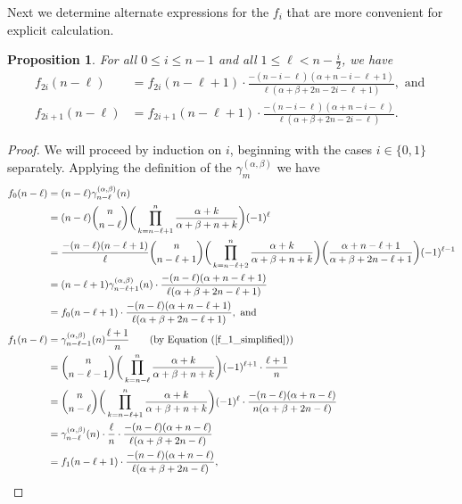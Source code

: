 \documentclass{amsart}
\theoremstyle{plain}
\newtheorem{prop}[equation]{Proposition}
\theoremstyle{remark}
\begin{document}
Next we determine alternate expressions for the $f_i$ that are more convenient for explicit calculation.

\begin{prop} \label{f(n-l)_prop}
For all $0\le i\le n-1$ and all $1\le \ell<n-\frac{i}{2}$, we have
\begin{align*}
    f_{2i}(n-\ell)&=f_{2i}(n-\ell+1)\cdot\frac{-(n-i-\ell)(\alpha+n-i-\ell+1)}{\ell(\alpha+\beta+2n-2i-\ell+1)}, \text{ and } \\
    f_{2i+1}(n-\ell)&=f_{2i+1}(n-\ell+1)\cdot\frac{-(n-i-\ell)(\alpha+n-i-\ell)}{\ell(\alpha+\beta+2n-2i-\ell)}.
\end{align*}    
\end{prop}

\begin{proof}
We will proceed by induction on $i$, beginning with the cases $i \in \lbrace 0,1\rbrace$ separately.  Applying  the definition of the $\gamma_{m}^{(\alpha,\beta)}$ we have
\begin{align*}
    f_0(n-\ell)&=(n-\ell)\gamma_{n-\ell}^{(\alpha,\beta)}(n)\\
    &=(n-\ell)\binom{n}{n-\ell}\bigg(\prod_{k=n-\ell+1}^n\frac{\alpha+k}{\alpha+\beta+n+k}\bigg)(-1)^\ell \\
    &=\frac{-(n-\ell)(n-\ell+1)}{\ell}\binom{n}{n-\ell+1}\bigg(\prod_{k=n-\ell+2}^n\frac{\alpha+k}{\alpha+\beta+n+k}\bigg)\bigg(\frac{\alpha+n-\ell+1}{\alpha+\beta+2n-\ell+1}\bigg)(-1)^{\ell-1}\\
    &=(n-\ell+1)\gamma_{n-\ell+1}^{(\alpha,\beta)}(n)\cdot\frac{-(n-\ell)(\alpha+n-\ell+1)}{\ell(\alpha+\beta+2n-\ell+1)}\\
    &=f_0(n-\ell+1)\cdot\frac{-(n-\ell)(\alpha+n-\ell+1)}{\ell(\alpha+\beta+2n-\ell+1)}, \text{ and} \\
    f_1(n-\ell)&=\gamma_{n-\ell-1}^{(\alpha,\beta)}(n)\frac{\ell+1}{n} \qquad \text{(by Equation (\ref{f_1_simplified}))}\\
    &=\binom{n}{n-\ell-1}\bigg(\prod_{k=n-\ell}^n\frac{\alpha+k}{\alpha+\beta+n+k}\bigg)(-1)^{\ell+1}\cdot\frac{\ell+1}{n}\\
    &=\binom{n}{n-\ell}\bigg(\prod_{k=n-\ell+1}^n\frac{\alpha+k}{\alpha+\beta+n+k}\bigg)(-1)^{\ell}\cdot\frac{-(n-\ell)(\alpha+n-\ell)}{n(\alpha+\beta+2n-\ell)}\\
    &=\gamma_{n-\ell}^{(\alpha,\beta)}(n)\cdot\frac{\ell}{n}\cdot\frac{-(n-\ell)(\alpha+n-\ell)}{\ell(\alpha+\beta+2n-\ell)}\\
    &=f_1(n-\ell+1)\cdot\frac{-(n-\ell)(\alpha+n-\ell)}{\ell(\alpha+\beta+2n-\ell)},

\end{align*}
\end{proof}
\end{document}
